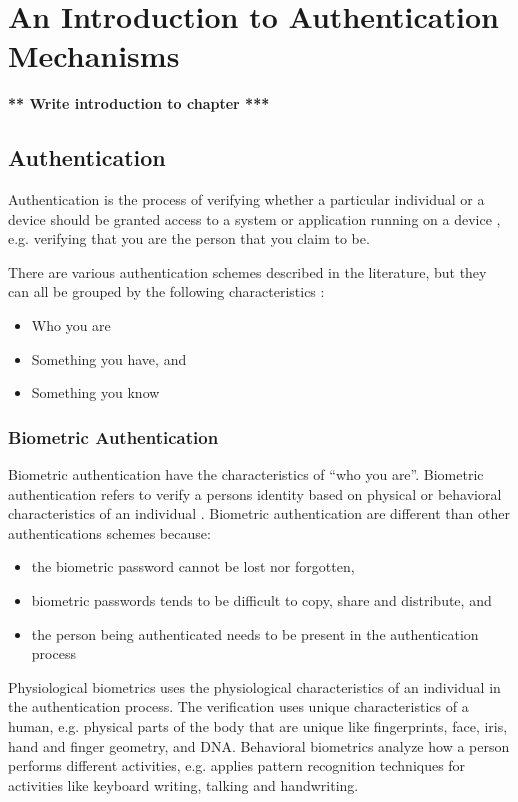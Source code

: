   \chapter{An Introduction to Authentication Mechanisms}
  
  {\bf *** Write introduction to chapter ***}

  \clearpage

  \section{Authentication}

  Authentication is the process of verifying whether a particular individual or a device should be granted access to a system or application running on a device \cite{IPAS}, e.g. verifying that you are the person that you claim to be.

  There are various authentication schemes described in the literature, but they can all be grouped by the following characteristics \cite{IPAS}:

    \begin{itemize}
      \item Who you are
      \item Something you have, and
      \item Something you know
    \end{itemize}

    \subsection{Biometric Authentication}
    Biometric authentication have the characteristics of ``who you are''. Biometric authentication refers to verify a persons identity based on physical or behavioral characteristics of an individual \cite{biometrics, biometrics2}. Biometric authentication are different than other authentications schemes because:

      \begin{itemize}
        \item the biometric password cannot be lost nor forgotten,
        \item biometric passwords tends to be difficult to copy, share and distribute, and 
        \item the person being authenticated needs to be present in the authentication process
      \end{itemize} 

     Physiological biometrics uses the physiological characteristics of an individual in the authentication process. The verification uses unique characteristics of a human, e.g. physical parts of the body that are unique like fingerprints, face, iris, hand and finger geometry, and DNA. Behavioral biometrics analyze how a person performs different activities, e.g. applies pattern recognition techniques for activities like keyboard writing, talking and handwriting.

